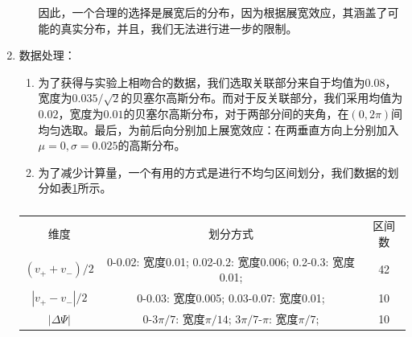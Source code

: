 \documentclass[aps,pre,12pt,preprint,onecolumn,showpacs,showkeys]{revtex4-1}
\begin{document}
\begin{enumerate}
\begin{enumerate}
        因此，一个合理的选择是展宽后的分布，因为根据展宽效应，其涵盖了可能的真实分布，并且，我们无法进行进一步的限制。
    \end{enumerate}
    \item 数据处理：
    \begin{enumerate}
        \item 为了获得与实验上相吻合的数据，我们选取关联部分来自于均值为$0.08$，宽度为$0.035/\sqrt{2}$的贝塞尔高斯分布。而对于反关联部分，我们采用均值为$0.02$，宽度为$0.01$的贝塞尔高斯分布，对于两部分间的夹角，在$(0,2\pi)$间均匀选取。最后，为前后向分别加上展宽效应：在两垂直方向上分别加入$\mu=0,\sigma=0.025$的高斯分布。
        \item 为了减少计算量，一个有用的方式是进行不均匀区间划分，我们数据的划分如表\ref{tab:bu1}所示。
    \end{enumerate}
    \begin{table}[htbp]
    \caption{\label{tab:bu1}}
    \begin{ruledtabular}
    \begin{tabular}{c|c|c}
    维度&划分方式&区间数\\
    \colrule
    $(v_++v_-)/2$&0-0.02: 宽度0.01;
    0.02-0.2: 宽度0.006;
    0.2-0.3: 宽度0.01;
    &42\\
    $|v_+-v_-|/2$&0-0.03: 宽度0.005;
    0.03-0.07: 宽度0.01;&10\\
    $|\Delta\Psi|$&0-$3\pi/7$: 宽度$\pi/14$;
    $3\pi/7$-$\pi$: 宽度$\pi/7$;&10    
    \end{tabular}
    \end{ruledtabular}
    \end{table}
\end{enumerate}
\end{document}
